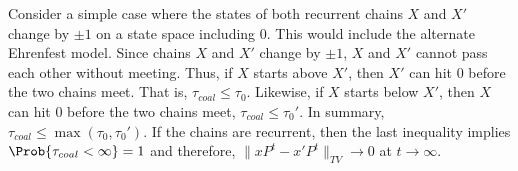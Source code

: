 \documentclass[12pt]{article}
\begin{document}
    \begin{example}
        Consider a simple case where the states of both recurrent chains
        \( X \) and \( X' \) change by \( \pm 1 \) on a state space
        including \( 0 \).  This would include the alternate Ehrenfest
        model.  Since chains \( X \) and \( X' \) change by \( \pm 1 \),
        \( X \) and \( X' \) cannot pass each other without meeting.
        Thus, if \( X \) starts above \( X' \), then \( X' \) can hit \(
        0 \) before the two chains meet.  That is, \( \tau_{coal} \le
        \tau_0 \).  Likewise, if \( X \) starts below \( X' \), then \(
        X \) can hit \( 0 \) before the two chains meet, \( \tau_{coal}
        \le \tau_0' \).  In summary, \( \tau_{coal} \le \max(\tau_0,
        \tau_0') \).  If the chains are recurrent, then the last
        inequality implies \( \Prob{\tau_{coal} < \infty} = 1 \) and
        therefore, \( \| x P^t - x' P^t\|_{TV} \to 0 \) at \( t \to
        \infty \).
    \end{example}
\end{document}
